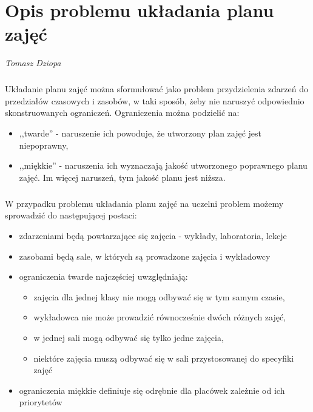 \chapter{Opis problemu układania planu zajęć}
\textit{Tomasz Dziopa}
\paragraph{}Układanie planu zajęć można sformułować jako problem przydzielenia zdarzeń do przedziałów czasowych i zasobów, w taki sposób, żeby nie naruszyć odpowiednio skonstruowanych ograniczeń. Ograniczenia można podzielić na:
\begin{itemize}
\item ,,twarde'' - naruszenie ich powoduje, że utworzony plan zajęć jest niepoprawny,
\item ,,miękkie'' - naruszenia ich wyznaczają jakość utworzonego poprawnego planu zajęć. Im więcej naruszeń, tym jakość planu jest niższa.
\end{itemize}
\paragraph{}W przypadku problemu układania planu zajęć na uczelni problem możemy sprowadzić do następującej postaci:
\begin{itemize}
\item zdarzeniami będą powtarzające się zajęcia - wykłady, laboratoria, lekcje
\item zasobami będą sale, w których są prowadzone zajęcia i wykładowcy
\item ograniczenia twarde najczęściej uwzględniają:
	\begin{itemize}
	\item zajęcia dla jednej klasy nie mogą odbywać się w tym samym czasie,
	\item wykładowca nie może prowadzić równocześnie dwóch różnych zajęć,
	\item w jednej sali mogą odbywać się tylko jedne zajęcia,
	\item niektóre zajęcia muszą odbywać się w sali przystosowanej do specyfiki zajęć 
	\end{itemize}
\item ograniczenia miękkie definiuje się odrębnie dla placówek zależnie od ich priorytetów
\end{itemize}



